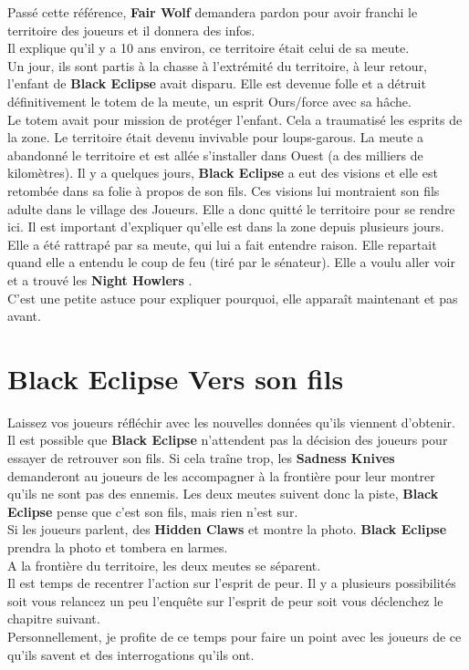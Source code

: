 \documentclass[oneside,12pt]{book}
\newcommand{\BlackEclipse}{\textbf{Black Eclipse} }
\newcommand{\Night}{\textbf{Night Howlers} }
\newcommand{\Sadness}{\textbf{Sadness Knives} }
\newcommand{\Hidden}{\textbf{Hidden Claws} }
\begin{document}
\begin{flushleft}
Passé cette référence, \textbf{Fair Wolf} demandera pardon pour avoir franchi le territoire des joueurs et il donnera des infos. \\
Il explique qu'il y a 10 ans environ, ce territoire était celui de sa meute.\\
Un jour, ils sont partis à la chasse à l'extrémité du territoire, à leur retour, l'enfant de \BlackEclipse avait disparu. Elle est devenue folle et a détruit définitivement le totem de la meute, un esprit Ours/force avec sa hâche. \\
Le totem avait pour mission de protéger l'enfant. Cela a traumatisé les esprits de la zone. Le territoire était devenu invivable pour loups-garous. La meute a abandonné le territoire et est allée s'installer dans Ouest (a des milliers de kilomètres). Il y a quelques jours, \BlackEclipse a eut des visions et elle est retombée dans sa folie à propos de son fils. Ces visions lui montraient son fils adulte dans le village des Joueurs. Elle a donc quitté le territoire pour se rendre ici. Il est important d'expliquer qu'elle est dans la zone depuis plusieurs jours. Elle a été rattrapé par sa meute, qui lui a fait entendre raison. Elle repartait quand elle a entendu le coup de feu (tiré par le sénateur). 
Elle a voulu aller voir et a trouvé les \Night. \\
C'est une petite astuce pour expliquer pourquoi, elle apparaît maintenant et pas avant.\\

\section{Black Eclipse Vers son fils}
Laissez vos joueurs réfléchir avec les nouvelles données qu'ils viennent d'obtenir. Il est possible que \BlackEclipse n'attendent pas la décision des joueurs pour essayer de retrouver son fils.
Si cela traîne trop, les \Sadness demanderont au joueurs de les accompagner à la frontière pour leur montrer qu'ils ne sont pas des ennemis. Les deux meutes suivent donc la piste, \BlackEclipse pense que c'est son fils, mais rien n'est sur.\\ 
Si les joueurs parlent, des \Hidden et montre la photo. \BlackEclipse prendra la photo et tombera en larmes. \\
A la frontière du territoire,  les deux meutes se séparent.\\
Il est temps de recentrer l'action sur l'esprit de peur. Il y a plusieurs possibilités soit vous relancez un peu l'enquête sur l'esprit de peur soit vous déclenchez le chapitre suivant. \\
Personnellement, je profite de ce temps pour faire un point avec les joueurs de ce qu'ils savent et des interrogations qu'ils ont. \\



\end{flushleft}
\end{document}
